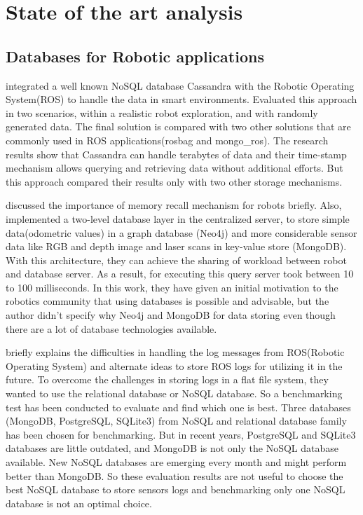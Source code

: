 

	\chapter{State of the art analysis} \label{stateof}
	
	\section{Databases for Robotic applications}
		\citet{article02} integrated a well known NoSQL database Cassandra with the Robotic Operating System(ROS) to handle the data in smart environments. Evaluated this approach in two scenarios, within a realistic robot exploration, and with randomly generated data. The final solution is compared with two other solutions that are commonly used in ROS applications(rosbag and mongo\_ros). The research results show that Cassandra can handle terabytes of data and their time-stamp mechanism allows querying and retrieving data without additional efforts. But this approach compared their results only with two other storage mechanisms. 
		
		\citet{article04} discussed the importance of memory recall mechanism for robots briefly. Also, implemented a two-level database layer in the centralized server, to store simple data(odometric values) in a graph database (Neo4j) and more considerable sensor data like RGB and depth image and laser scans in key-value store (MongoDB). With this architecture, they can achieve the sharing of workload between robot and database server. As a result, for executing this query server took between 10 to 100 milliseconds. In this work, they have given an initial motivation to the robotics community that using databases is possible and advisable, but the author didn't specify why  Neo4j and MongoDB for data storing even though there are a lot of database technologies available.
		
		\citet{article03} briefly explains the difficulties in handling the log messages from ROS(Robotic Operating System) and alternate ideas to store ROS logs for utilizing it in the future. To overcome the challenges in storing logs in a flat file system, they wanted to use the relational database or NoSQL database. So a benchmarking test has been conducted to evaluate and find which one is best. Three databases (MongoDB, PostgreSQL, SQLite3) from NoSQL and relational database family has been chosen for benchmarking. But in recent years, PostgreSQL and SQLite3 databases are little outdated, and MongoDB is not only the NoSQL database available. New NoSQL databases are emerging every month and might perform better than MongoDB. So these evaluation results are not useful to choose the best NoSQL database to store sensors logs and benchmarking only one NoSQL database is not an optimal choice.
		
